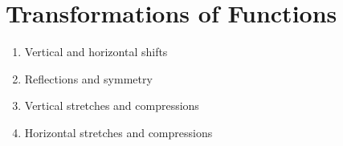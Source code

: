 
\chapter{Transformations of Functions}

\begin{enumerate}
\item Vertical and horizontal shifts

\item Reflections and symmetry

\item Vertical stretches and compressions

\item Horizontal stretches and compressions
\end{enumerate}
